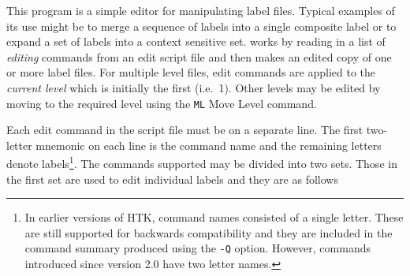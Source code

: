 %
%

\newpage
{}


This program is a simple editor for manipulating label files.
Typical examples of its use might be to merge a sequence of
labels into a single composite label or to expand a set of
labels into a context sensitive set.   works by
reading in a list of {\em editing} commands from an edit
script file and then makes an edited copy of one or more 
label files.  For multiple level files, edit commands are applied
to the \textit{current level} which is initially the first (i.e.\ 1).
Other levels may be edited by moving to the required level using the
\texttt{ML} Move Level command.

Each edit command in the script file must be
on a separate line.  The first two-letter mnemonic on each line is the command name and
the remaining letters denote labels\footnote{In earlier versions of 
HTK,  command names consisted of a single letter.  These
are still supported for backwards compatibility and they are included
in the command summary produced using the \texttt{-Q} option.  
However, commands
introduced since version 2.0  have two letter names.}.
The commands supported may be divided into
two sets.  Those in the first set are used to edit individual
labels and they are as follows


